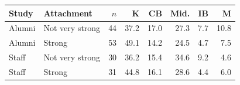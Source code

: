 \begin{tabular}{llrrrrrr}
\toprule
Study & Attachment & $n$ & K & CB & Mid. & IB & M \\
\midrule
Alumni & Not very strong & 44 & 37.2 & 17.0 & 27.3 & 7.7 & 10.8 \\
Alumni & Strong & 53 & 49.1 & 14.2 & 24.5 & 4.7 & 7.5 \\
Staff & Not very strong & 30 & 36.2 & 15.4 & 34.6 & 9.2 & 4.6 \\
Staff & Strong & 31 & 44.8 & 16.1 & 28.6 & 4.4 & 6.0 \\
\bottomrule
\end{tabular}
